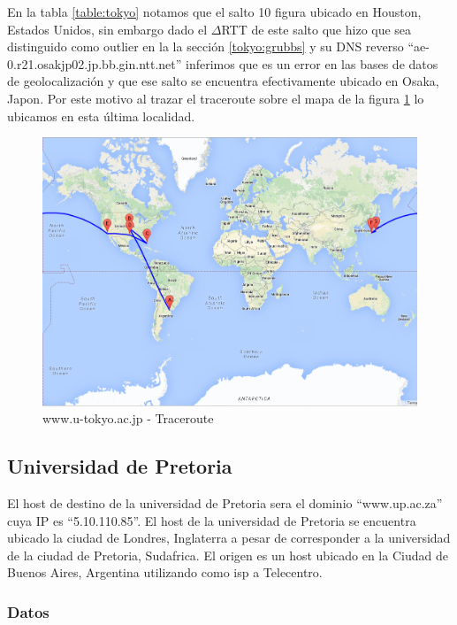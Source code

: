En la tabla \ref{table:tokyo} notamos que el salto 10 figura ubicado en Houston, Estados Unidos, sin embargo dado el $\Delta$RTT de este salto que hizo que sea distinguido como outlier en la la sección \ref{tokyo:grubbs} y su DNS reverso ``ae-0.r21.osakjp02.jp.bb.gin.ntt.net'' inferimos que es un error en las bases de datos de geolocalización y que ese salto se encuentra efectivamente ubicado en Osaka, Japon. Por este motivo al trazar el traceroute sobre el mapa de la figura \ref{mapa:tokyo} lo ubicamos en esta última localidad.

\begin{figure}[H]
    \begin{center}
        \includegraphics[width=1\textwidth]{data/mapa-tokyo.png}
        \caption{www.u-tokyo.ac.jp - Traceroute}
        \label{mapa:tokyo}
    \end{center}
\end{figure}

\subsection{Universidad de Pretoria}
El host de destino de la universidad de Pretoria sera el dominio ``www.up.ac.za'' cuya IP es ``5.10.110.85''. El host de la universidad de Pretoria se encuentra ubicado la ciudad de Londres, Inglaterra a pesar de corresponder a la universidad de la ciudad de Pretoria, Sudafrica. El origen es un host ubicado en la Ciudad de Buenos Aires, Argentina utilizando como isp a Telecentro.

\subsubsection{Datos}

